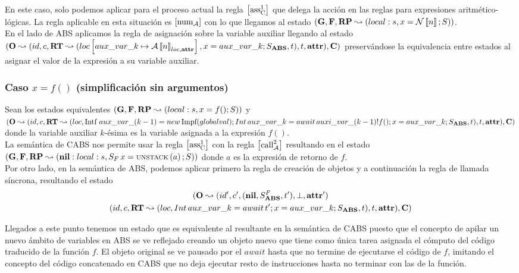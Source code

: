 En este caso, solo podemos aplicar para el proceso actual la regla $\left[ \text{ass}_{\text{C}}^{1} \right]$ que delega la acción en las reglas para expresiones aritmético-lógicas. La regla aplicable en esta situación es $\left[ \text{num}_{\mathcal{A}} \right]$ con lo que llegamos al estado $(\mathbf{G}, \mathbf{F}, \textbf{RP} \leadsto (local:s,x = \mathcal{N}\left\llbracket n \right\rrbracket\mbox{;\,}S))$.\\

En el lado de ABS aplicamos la regla de asignación sobre la variable auxiliar llegando al estado $(\mathbf{O} \leadsto (id, c, \textbf{RT} \leadsto (loc \left[ aux\_var\_k\mapsto\mathcal{A} \left\llbracket n \right\rrbracket_{loc, \textbf{attr}} \right], x = aux\_var\_k\mbox{;\,}S_{\textbf{ABS}}, t), t, \textbf{attr}), \mathbf{C})$ preservándose la equivalencia entre estados al asignar el valor de la expresión a su variable auxiliar.

\subsubsection{Caso $x = f()$ (simplificación sin argumentos)}
Sean los estados equivalentes $(\mathbf{G}, \mathbf{F}, \textbf{RP} \leadsto (local:s,x = f()\mbox{;\,}S))$ y $(\mathbf{O} \leadsto (id, c, \textbf{RT} \leadsto (loc, \mbox{Intf }  aux\_var\_(k-1) = new\, \mbox{Impf}(globalval) \mbox{;\,} Int\, aux\_var\_k = await\,auxi\_var\_(k-1)!f()\mbox{;\,} x = aux\_var\_k\mbox{;\,} S_{\textbf{ABS}}, t), t, \textbf{attr}), \mathbf{C})$ donde la variable auxiliar $k$-ésima es la variable asignada a la expresión $f()$.\\

La semántica de CABS nos permite usar la regla $\left[ \text{ass}_{\text{C}}^{1} \right]$ con la regla $\left[ \text{call}_{\mathcal{A}}^2 \right]$ resultando en el estado $(\mathbf{G}, \mathbf{F}, \textbf{RP} \leadsto (\textbf{nil}:local:s, S_F\,x = \text{\scriptsize{UNSTACK}}\left(a\right)\mbox{;\,}S))$ donde $a$ es la expresión de retorno de $f$.\\

Por otro lado, en la semántica de ABS, podemos aplicar primero la regla de creación de objetos y a continuación la regla de llamada síncrona, resultando el estado
\begin{multline*}
  (\mathbf{O} \leadsto (id', c', (\textbf{nil}, S_{\textbf{ABS}}^F, t'), \perp, \textbf{attr}')\\
  (id, c, \textbf{RT} \leadsto (loc, Int\, aux\_var\_k = await\,t'\mbox{;\,} x = aux\_var\_k\mbox{;\,} S_{\textbf{ABS}}, t), t, \textbf{attr}), \mathbf{C})
\end{multline*}

Llegados a este punto tenemos un estado que es equivalente al resultante en la semántica de CABS puesto que el concepto de apilar un nuevo ámbito de variables en ABS se ve reflejado creando un objeto nuevo que tiene como única tarea asignada el cómputo del código traducido de la función $f$. El objeto original se ve pausado por el $await$ hasta que no termine de ejecutarse el código de $f$, imitando el concepto del código concatenado en CABS que no deja ejecutar resto de instrucciones hasta no terminar con las de la función.\\

